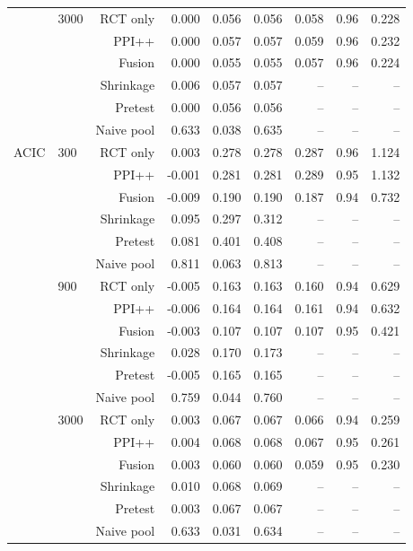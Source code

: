 \begin{tabular}{llrrrrrrr}
 & 3000 & RCT only & 0.000 & 0.056 & 0.056 & 0.058 & 0.96 & 0.228 \\
 &  & PPI++ & 0.000 & 0.057 & 0.057 & 0.059 & 0.96 & 0.232 \\
 &  & Fusion & 0.000 & 0.055 & 0.055 & 0.057 & 0.96 & 0.224 \\
 &  & Shrinkage & 0.006 & 0.057 & 0.057 & -- & -- & -- \\
 &  & Pretest & 0.000 & 0.056 & 0.056 & -- & -- & -- \\
 &  & Naive pool & 0.633 & 0.038 & 0.635 & -- & -- & -- \\
\midrule
ACIC & 300 & RCT only & 0.003 & 0.278 & 0.278 & 0.287 & 0.96 & 1.124 \\
 &  & PPI++ & -0.001 & 0.281 & 0.281 & 0.289 & 0.95 & 1.132 \\
 &  & Fusion & -0.009 & 0.190 & 0.190 & 0.187 & 0.94 & 0.732 \\
 &  & Shrinkage & 0.095 & 0.297 & 0.312 & -- & -- & -- \\
 &  & Pretest & 0.081 & 0.401 & 0.408 & -- & -- & -- \\
 &  & Naive pool & 0.811 & 0.063 & 0.813 & -- & -- & -- \\
\addlinespace
 & 900 & RCT only & -0.005 & 0.163 & 0.163 & 0.160 & 0.94 & 0.629 \\
 &  & PPI++ & -0.006 & 0.164 & 0.164 & 0.161 & 0.94 & 0.632 \\
 &  & Fusion & -0.003 & 0.107 & 0.107 & 0.107 & 0.95 & 0.421 \\
 &  & Shrinkage & 0.028 & 0.170 & 0.173 & -- & -- & -- \\
 &  & Pretest & -0.005 & 0.165 & 0.165 & -- & -- & -- \\
 &  & Naive pool & 0.759 & 0.044 & 0.760 & -- & -- & -- \\
\addlinespace
 & 3000 & RCT only & 0.003 & 0.067 & 0.067 & 0.066 & 0.94 & 0.259 \\
 &  & PPI++ & 0.004 & 0.068 & 0.068 & 0.067 & 0.95 & 0.261 \\
 &  & Fusion & 0.003 & 0.060 & 0.060 & 0.059 & 0.95 & 0.230 \\
 &  & Shrinkage & 0.010 & 0.068 & 0.069 & -- & -- & -- \\
 &  & Pretest & 0.003 & 0.067 & 0.067 & -- & -- & -- \\
 &  & Naive pool & 0.633 & 0.031 & 0.634 & -- & -- & -- \\
\bottomrule
\end{tabular}

